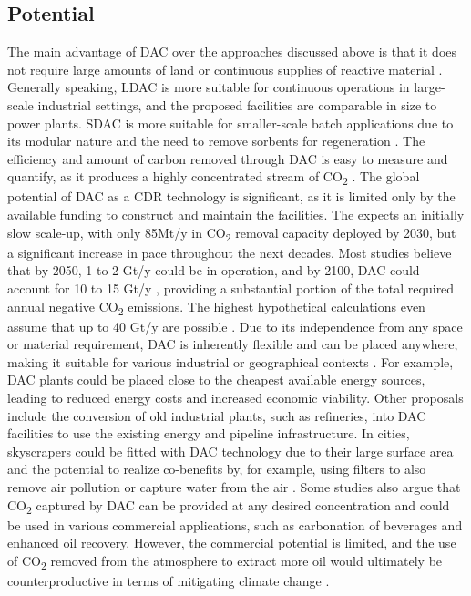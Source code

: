 \subsection*{Potential}
The main advantage of DAC over the approaches discussed above is that it does not require large amounts of land or continuous supplies of reactive material \parencite{Mulligan2020CarbonShot:States, IEA2022DirectZero}.
Generally speaking, LDAC is more suitable for continuous operations in large-scale industrial settings, and the proposed facilities are comparable in size to power plants. SDAC is more suitable for smaller-scale batch applications due to its modular nature and the need to remove sorbents for regeneration \parencite[22-23]{IEA2022DirectZero}. The efficiency and amount of carbon removed through DAC is easy to measure and quantify, as it produces a highly concentrated stream of CO\textsubscript{2} \parencite{Lawler2022WhatTechnology}.
The global potential of DAC as a CDR technology is significant, as it is limited only by the available funding to construct and maintain the facilities. The \textcite{IEA2022DirectZero} expects an initially slow scale-up, with only 85Mt/y in CO\textsubscript{2} removal capacity deployed by 2030, but a significant increase in pace throughout the next decades. Most studies believe that by 2050, 1 to 2 Gt/y could be in operation, and by 2100, DAC could account for 10 to 15 Gt/y \parencite{Mulligan2020CarbonShot:States, IEA2022DirectZero}, providing a substantial portion of the total required annual negative CO\textsubscript{2} emissions. The highest hypothetical calculations even assume that up to 40 Gt/y are possible \parencite{Fuss2018NegativeEffects}.
Due to its independence from any space or material requirement, DAC is inherently flexible and can be placed anywhere, making it suitable for various industrial or geographical contexts \parencite[189]{NAS2018NegativeAgenda}. For example, DAC plants could be placed close to the cheapest available energy sources, leading to reduced energy costs and increased economic viability. Other proposals include the conversion of old industrial plants, such as refineries, into DAC facilities to use the existing energy and pipeline infrastructure. In cities, skyscrapers could be fitted with DAC technology due to their large surface area and the potential to realize co-benefits by, for example, using filters to also remove air pollution or capture water from the air \parencite{Lawler2022WhatTechnology}. Some studies also argue that CO\textsubscript{2} captured by DAC can be provided at any desired concentration and could be used in various commercial applications, such as carbonation of beverages and enhanced oil recovery. However, the commercial potential is limited, and the use of CO\textsubscript{2} removed from the atmosphere to extract more oil would ultimately be counterproductive in terms of mitigating climate change \parencite{Erans2022DirectChallenges}.

